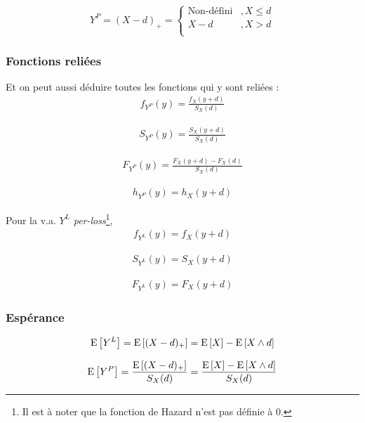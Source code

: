 \documentclass[12pt, french]{report}
\begin{document}
\begin{equation}
Y^P = (X-d)_+ = 
\begin{cases}
\text{Non-défini}		& , X \leq d \\
X - d	& , X > d \\
\end{cases}
\end{equation}

\subsubsection{Fonctions reliées}

Et on peut aussi déduire toutes les fonctions qui y sont reliées : 
\begin{align*}
f_{Y^P}(y) = \frac{f_X(y+d)}{S_X(d)}
\end{align*}

\begin{align*}
S_{Y^P}(y) = \frac{S_X(y+d)}{S_X(d)}
\end{align*}

\begin{align*}
F_{Y^P}(y) = \frac{F_X(y+d) - F_X(d)}{S_X(d)}
\end{align*}

\begin{align*}
h_{Y^P}(y) = h_X(y+d)
\end{align*}

Pour la v.a. $Y^L$ \textit{per-loss}\footnote{Il est à noter que la fonction de Hazard n'est pas définie à 0.},
\begin{align*}
f_{Y^L}(y) = f_X(y+d)
\end{align*}

\begin{align*}
S_{Y^L}(y) = S_X(y+d)
\end{align*}

\begin{align*}
F_{Y^L}(y) = F_X(y+d)
\end{align*}

\subsubsection{Espérance}
\begin{equation}
\mathrm{E} \left[ Y^L \right] = \mathrm{E} \left[ (X-d)_+ \right] = \mathrm{E} \left[ X \right] - \mathrm{E} \left[ X \wedge d \right]
\end{equation}

\begin{equation}
\mathrm{E} \left[ Y^P \right] = \frac{\mathrm{E} \left[ (X-d)_+ \right]}{S_X(d)} = \frac{\mathrm{E} \left[ X \right] - \mathrm{E} \left[ X \wedge d \right]}{S_X(d)}
\end{equation}
\end{document}
